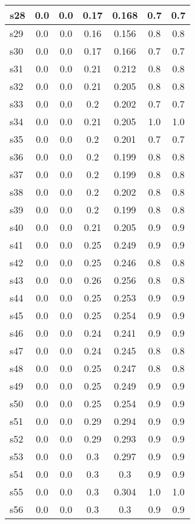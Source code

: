 \documentclass{article}
\begin{document}
\begin{tabular}{|l|c|c|c|c|c|c|}
\hline
s28 &0.0 & 0.0 & 0.17 & 0.168 & 0.7 & 0.7\\
\hline
s29 &0.0 & 0.0 & 0.16 & 0.156 & 0.8 & 0.8\\
\hline
s30 &0.0 & 0.0 & 0.17 & 0.166 & 0.7 & 0.7\\
\hline
s31 &0.0 & 0.0 & 0.21 & 0.212 & 0.8 & 0.8\\
\hline
s32 &0.0 & 0.0 & 0.21 & 0.205 & 0.8 & 0.8\\
\hline
s33 &0.0 & 0.0 & 0.2 & 0.202 & 0.7 & 0.7\\
\hline
s34 &0.0 & 0.0 & 0.21 & 0.205 & 1.0 & 1.0\\
\hline
s35 &0.0 & 0.0 & 0.2 & 0.201 & 0.7 & 0.7\\
\hline
s36 &0.0 & 0.0 & 0.2 & 0.199 & 0.8 & 0.8\\
\hline
s37 &0.0 & 0.0 & 0.2 & 0.199 & 0.8 & 0.8\\
\hline
s38 &0.0 & 0.0 & 0.2 & 0.202 & 0.8 & 0.8\\
\hline
s39 &0.0 & 0.0 & 0.2 & 0.199 & 0.8 & 0.8\\
\hline
s40 &0.0 & 0.0 & 0.21 & 0.205 & 0.9 & 0.9\\
\hline
s41 &0.0 & 0.0 & 0.25 & 0.249 & 0.9 & 0.9\\
\hline
s42 &0.0 & 0.0 & 0.25 & 0.246 & 0.8 & 0.8\\
\hline
s43 &0.0 & 0.0 & 0.26 & 0.256 & 0.8 & 0.8\\
\hline
s44 &0.0 & 0.0 & 0.25 & 0.253 & 0.9 & 0.9\\
\hline
s45 &0.0 & 0.0 & 0.25 & 0.254 & 0.9 & 0.9\\
\hline
s46 &0.0 & 0.0 & 0.24 & 0.241 & 0.9 & 0.9\\
\hline
s47 &0.0 & 0.0 & 0.24 & 0.245 & 0.8 & 0.8\\
\hline
s48 &0.0 & 0.0 & 0.25 & 0.247 & 0.8 & 0.8\\
\hline
s49 &0.0 & 0.0 & 0.25 & 0.249 & 0.9 & 0.9\\
\hline
s50 &0.0 & 0.0 & 0.25 & 0.254 & 0.9 & 0.9\\
\hline
s51 &0.0 & 0.0 & 0.29 & 0.294 & 0.9 & 0.9\\
\hline
s52 &0.0 & 0.0 & 0.29 & 0.293 & 0.9 & 0.9\\
\hline
s53 &0.0 & 0.0 & 0.3 & 0.297 & 0.9 & 0.9\\
\hline
s54 &0.0 & 0.0 & 0.3 & 0.3 & 0.9 & 0.9\\
\hline
s55 &0.0 & 0.0 & 0.3 & 0.304 & 1.0 & 1.0\\
\hline
s56 &0.0 & 0.0 & 0.3 & 0.3 & 0.9 & 0.9\\

\end{tabular}
\end{document}
